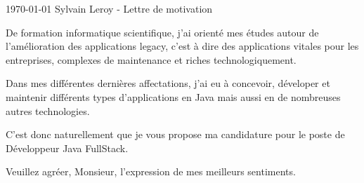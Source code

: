 \documentclass[11pt, a4paper]{awesome-cv}
\begin{document}
\makecvheader

\makecvfooter
  {\today}
  {Sylvain Leroy - Lettre de motivation}
  {}

\makelettertitle

\begin{cvletter}


De formation informatique scientifique, j'ai orienté mes études autour de l'amélioration des applications legacy, c'est à dire des applications vitales pour les entreprises, complexes de maintenance et riches technologiquement. 

Dans mes différentes dernières affectations, j'ai eu à concevoir, déveloper et maintenir différents types d'applications en Java mais aussi en de nombreuses autres technologies.


C'est donc naturellement que je vous propose ma candidature pour le poste de Développeur Java FullStack.


Veuillez agréer, Monsieur, l'expression de mes meilleurs sentiments.


\end{cvletter}


\makeletterclosing
\end{document}
